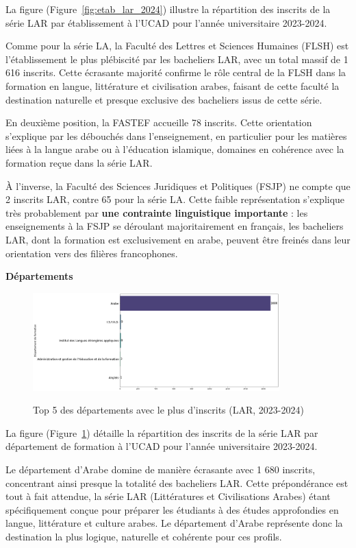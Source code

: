La figure (Figure~\ref{fig:etab_lar_2024}) illustre la répartition des inscrits de la série LAR par établissement à l'UCAD pour l'année universitaire 2023-2024.

Comme pour la série LA, la Faculté des Lettres et Sciences Humaines (FLSH) est l’établissement le plus plébiscité par les bacheliers LAR, avec un total massif de 1 616 inscrits. 
Cette écrasante majorité confirme le rôle central de la FLSH dans la formation en langue, littérature et civilisation arabes, faisant de cette faculté la destination naturelle et presque exclusive des bacheliers issus de cette série.

En deuxième position, la FASTEF accueille 78 inscrits. Cette orientation s'explique par les débouchés dans l’enseignement, en particulier pour les matières liées à la langue arabe ou à l’éducation islamique, domaines en cohérence avec la formation reçue dans la série LAR.

À l’inverse, la Faculté des Sciences Juridiques et Politiques (FSJP) ne compte que 2 inscrits LAR, contre 65 pour la série LA. 
Cette faible représentation s’explique très probablement par \textbf{une contrainte linguistique importante} : 
les enseignements à la FSJP se déroulant majoritairement en français, les bacheliers LAR, dont la formation est exclusivement en arabe, peuvent être freinés dans leur orientation vers des filières francophones.

\textbf{Départements}

\begin{figure}[ht]
\centering
\caption{Top 5 des départements avec le plus d'inscrits (LAR, 2023-2024)}
\includegraphics[width=0.85\textwidth]{figure/dep_LAR_2024.png}
\label{fig:dep_lar_2024}
\end{figure}

La figure (Figure~\ref{fig:dep_lar_2024}) détaille la répartition des inscrits de la série LAR par département de formation à l'UCAD pour l'année universitaire 2023-2024.

Le département d’Arabe domine de manière écrasante avec 1 680 inscrits, concentrant ainsi presque la totalité des bacheliers LAR. 
Cette prépondérance est tout à fait attendue, la série LAR (Littératures et Civilisations Arabes) étant spécifiquement conçue pour préparer les étudiants à des études approfondies en langue, littérature et culture arabes. 
Le département d’Arabe représente donc la destination la plus logique, naturelle et cohérente pour ces profils.

